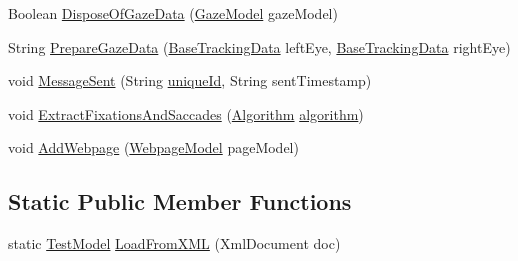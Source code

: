 \begin{DoxyCompactItemize}
\item 
Boolean \hyperlink{class_web_analyzer_1_1_models_1_1_data_model_1_1_test_model_a5f84a8ffb744cbe5dc345e1f34bff9a6}{Dispose\+Of\+Gaze\+Data} (\hyperlink{class_web_analyzer_1_1_models_1_1_data_model_1_1_gaze_model}{Gaze\+Model} gaze\+Model)
\item 
String \hyperlink{class_web_analyzer_1_1_models_1_1_data_model_1_1_test_model_a3557a6cfa17577cb62c9e711cff1625e}{Prepare\+Gaze\+Data} (\hyperlink{class_web_analyzer_1_1_models_1_1_base_1_1_base_tracking_data}{Base\+Tracking\+Data} left\+Eye, \hyperlink{class_web_analyzer_1_1_models_1_1_base_1_1_base_tracking_data}{Base\+Tracking\+Data} right\+Eye)
\item 
void \hyperlink{class_web_analyzer_1_1_models_1_1_data_model_1_1_test_model_af5443d18d5c7d80edaf417ee28bb296e}{Message\+Sent} (String \hyperlink{_u_i_2_h_t_m_l_resources_2js_2lib_2underscore_8min_8js_af690ff5521d79c7128861033ae80ae17}{unique\+Id}, String sent\+Timestamp)
\item 
void \hyperlink{class_web_analyzer_1_1_models_1_1_data_model_1_1_test_model_aca2998a693a880f8c1fd1457615988ac}{Extract\+Fixations\+And\+Saccades} (\hyperlink{class_web_analyzer_1_1_models_1_1_algorithm_model_1_1_algorithm}{Algorithm} \hyperlink{_u_i_2_h_t_m_l_resources_2js_2src_2analyse_8js_a1222cf9678e9ad6a699b071d3308f976}{algorithm})
\item 
void \hyperlink{class_web_analyzer_1_1_models_1_1_data_model_1_1_test_model_a1bcf5235fe6f1f1b24ff74325742021e}{Add\+Webpage} (\hyperlink{class_web_analyzer_1_1_models_1_1_data_model_1_1_webpage_model}{Webpage\+Model} page\+Model)
\end{DoxyCompactItemize}
\subsection*{Static Public Member Functions}
\begin{DoxyCompactItemize}
\item 
static \hyperlink{class_web_analyzer_1_1_models_1_1_data_model_1_1_test_model}{Test\+Model} \hyperlink{class_web_analyzer_1_1_models_1_1_data_model_1_1_test_model_a0bf31831033b33d1e50ddd856c6a61aa}{Load\+From\+X\+M\+L} (Xml\+Document doc)
\end{DoxyCompactItemize}
